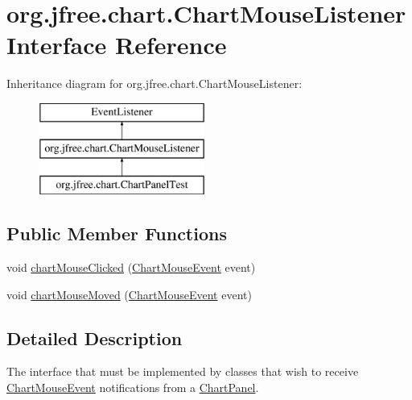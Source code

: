\hypertarget{interfaceorg_1_1jfree_1_1chart_1_1_chart_mouse_listener}{}\section{org.\+jfree.\+chart.\+Chart\+Mouse\+Listener Interface Reference}
\label{interfaceorg_1_1jfree_1_1chart_1_1_chart_mouse_listener}
Inheritance diagram for org.\+jfree.\+chart.\+Chart\+Mouse\+Listener\+:\begin{figure}[H]
\begin{center}
\leavevmode
\includegraphics[height=3.000000cm]{interfaceorg_1_1jfree_1_1chart_1_1_chart_mouse_listener}
\end{center}
\end{figure}
\subsection*{Public Member Functions}
\begin{DoxyCompactItemize}
\item 
void \mbox{\hyperlink{interfaceorg_1_1jfree_1_1chart_1_1_chart_mouse_listener_afa372155dc6454a3fbfb0b5118b15f39}{chart\+Mouse\+Clicked}} (\mbox{\hyperlink{classorg_1_1jfree_1_1chart_1_1_chart_mouse_event}{Chart\+Mouse\+Event}} event)
\item 
void \mbox{\hyperlink{interfaceorg_1_1jfree_1_1chart_1_1_chart_mouse_listener_acc035e045f3d957c0ce9e6b5ab4fbecd}{chart\+Mouse\+Moved}} (\mbox{\hyperlink{classorg_1_1jfree_1_1chart_1_1_chart_mouse_event}{Chart\+Mouse\+Event}} event)
\end{DoxyCompactItemize}


\subsection{Detailed Description}
The interface that must be implemented by classes that wish to receive \mbox{\hyperlink{classorg_1_1jfree_1_1chart_1_1_chart_mouse_event}{Chart\+Mouse\+Event}} notifications from a \mbox{\hyperlink{classorg_1_1jfree_1_1chart_1_1_chart_panel}{Chart\+Panel}}.

